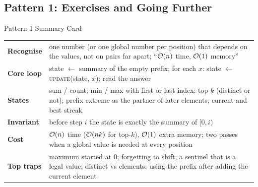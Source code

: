 \subsection{Pattern 1: Exercises and Going Further}
\label{ssec:ch1-p1-ex}

\begin{patternbox}{Pattern 1 Summary Card}
\begin{tabularx}{\linewidth}{@{}>{\bfseries}l X@{}}
Recognise & one number (or one global number per position) that depends on the values, not on pairs far apart; ``$\mathcal{O}(n)$ time, $\mathcal{O}(1)$ memory'' \\
Core loop & state $\gets$ summary of the empty prefix; for each $x$: state $\gets$ \textsc{update}(state, $x$); read the answer \\
States & sum / count; min / max with first or last index; top-$k$ (distinct or not); prefix extreme as the partner of later elements; current and best streak \\
Invariant & before step $i$ the state is exactly the summary of $[0, i)$ \\
Cost & $\mathcal{O}(n)$ time ($\mathcal{O}(nk)$ for top-$k$), $\mathcal{O}(1)$ extra memory; two passes when a global value is needed at every position \\
Top traps & maximum started at $0$; forgetting to shift; a sentinel that is a legal value; distinct vs elements; using the prefix after adding the current element \\
\end{tabularx}
\end{patternbox}

